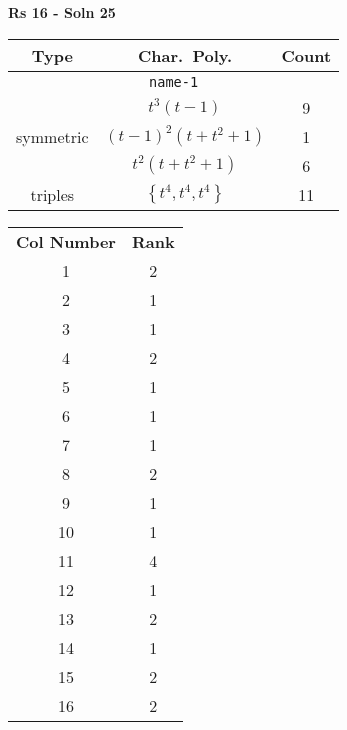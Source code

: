 \documentclass{article}
\begin{document}
    \textbf{Rs 16 - Soln 25}
    \begin{table}
    \begin{tabular}{|c|c|c|}
    \hline
    \textbf{Type} & \textbf{Char.~Poly.} & \textbf{Count} \\
    \hline \multicolumn{3}{|c|}{\texttt{name-1}} \\ \hline
    \multirow{3}{*}{symmetric}
    & $t^3(t - 1)$ & 9 \\
    & $(t - 1)^2(t + t^2 + 1)$ & 1 \\
    & $t^2(t + t^2 + 1)$ & 6 \\
    \hline
    \multirow{1}{*}{triples}
    & $\left\{t^4,t^4,t^4\right\}$ & 11 \\
    \hline
    \end{tabular}
    \end{table}
    \begin{table}
    \begin{tabular}{|c|c|}
    \hline
    \textbf{Col Number} & \textbf{Rank}\\
    1 & 2 \\ 
    2 & 1 \\ 
    3 & 1 \\ 
    4 & 2 \\ 
    5 & 1 \\ 
    6 & 1 \\ 
    7 & 1 \\ 
    8 & 2 \\ 
    9 & 1 \\ 
    10 & 1 \\ 
    11 & 4 \\ 
    12 & 1 \\ 
    13 & 2 \\ 
    14 & 1 \\ 
    15 & 2 \\ 
    16 & 2 \\ 
    \hline
    \end{tabular}
    \end{table}
    \newpage
\end{document}
